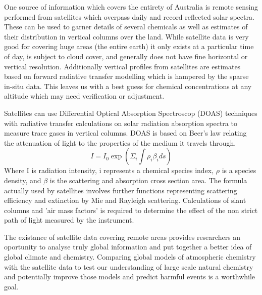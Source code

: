 One source of information which covers the entirety of Australia is remote sensing performed from satellites which overpass daily and record reflected solar spectra.
These can be used to garner details of several chemicals as well as estimates of their distribution in vertical columns over the land.
While satellite data is very good for covering huge areas (the entire earth) it only exists at a particular time of day, is subject to cloud cover, and generally does not have fine horizontal or vertical resolution.
Additionally vertical profiles from satellites are estimates based on forward radiative transfer modelling which is hampered by the sparse in-situ data.
This leaves us with a best guess for chemical concentrations at any altitude which may need verification or adjustment.

Satellites can use Differential Optical Absorption Spectroscop (DOAS) techniques with radiative transfer calculations on solar radiation absorption spectra to measure trace gases in vertical columns.
DOAS is based on Beer's law relating the attenuation of light to the properties of the medium it travels through. 
$$ I = I_0 \exp \left( \Sigma_i \int \rho_i \beta_i ds \right) $$
Where I is radiation intensity, i represents a chemical species index, $\rho$ is a species density, and $\beta$ is the scattering and absorption cross section area.
The formula actually used by satellites involves further functions representing scattering efficiency and extinction by Mie and Rayleigh scattering.
Calculations of slant columns and 'air mass factors' is required to determine the effect of the non strict path of light measured by the instrument.

The existance of satellite data covering remote areas provides researchers an oportunity to analyse truly global information and put together a better idea of global climate and chemistry.
Comparing global models of atmospheric chemistry with the satellite data to test our understanding of large scale natural chemistry and potentially improve those models and predict harmful events is a worthwhile goal.
